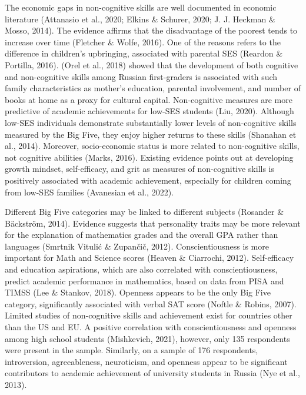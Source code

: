 \documentclass{article}
\begin{document}
The economic gaps in non-cognitive skills are well documented in
economic literature (Attanasio et al., 2020; Elkins \& Schurer, 2020; J.
J. Heckman \& Mosso, 2014). The evidence affirms that the disadvantage
of the poorest tends to increase over time (Fletcher \& Wolfe, 2016).
One of the reasons refers to the difference in children's upbringing,
associated with parental SES (Reardon \& Portilla, 2016). (Orel et al.,
2018) showed that the development of both cognitive and non-cognitive
skills among Russian first-graders is associated with such family
characteristics as mother's education, parental involvement, and number
of books at home as a proxy for cultural capital. Non-cognitive measures
are more predictive of academic achievements for low-SES students (Liu,
2020). Although low-SES individuals demonstrate substantially lower
levels of non-cognitive skills measured by the Big Five, they enjoy
higher returns to these skills (Shanahan et al., 2014). Moreover,
socio-economic status is more related to non-cognitive skills, not
cognitive abilities (Marks, 2016). Existing evidence points out at
developing growth mindset, self-efficacy, and grit as measures of
non-cognitive skills is positively associated with academic achievement,
especially for children coming from low-SES families (Avanesian et al.,
2022).

Different Big Five categories may be linked to different subjects
(Rosander \& Bäckström, 2014). Evidence suggests that personality traits
may be more relevant for the explanation of mathematics grades and the
overall GPA rather than languages (Smrtnik Vitulić \& Zupančič, 2012).
Conscientiousness is more important for Math and Science scores (Heaven
\& Ciarrochi, 2012). Self-efficacy and education aspirations, which are
also correlated with conscientiousness, predict academic performance in
mathematics, based on data from PISA and TIMSS (Lee \& Stankov, 2018).
Openness appears to be the only Big Five category, significantly
associated with verbal SAT score (Noftle \& Robins, 2007). Limited
studies of non-cognitive skills and achievement exist for countries
other than the US and EU. A positive correlation with conscientiousness
and openness among high school students (Mishkevich, 2021), however,
only 135 respondents were present in the sample. Similarly, on a sample
of 176 respondents, introversion, agreeableness, neuroticism, and
openness appear to be significant contributors to academic achievement
of university students in Russia (Nye et al., 2013).
\end{document}
